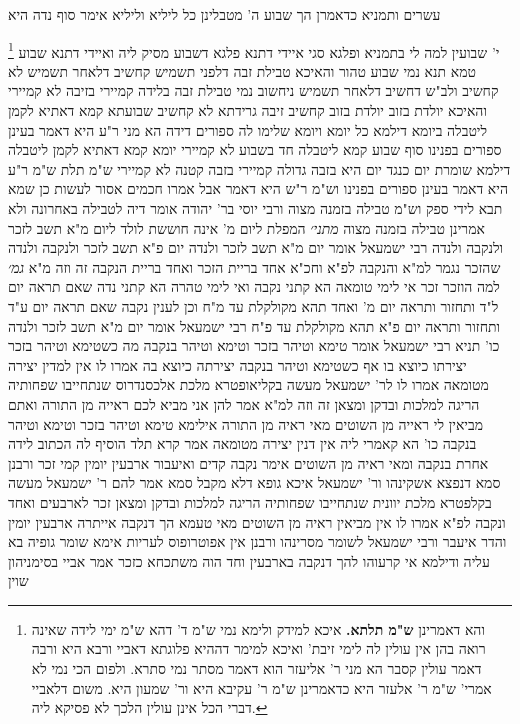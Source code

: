 \documentclass[12pt, openany]{book}
\newcommand{\footnotecomment}[1]{
	\renewcommand\thefootnote{}
	\footnote{#1}}
\newcommand{\commenta}[1]{\footnotecomment{#1}}
\begin{document}
{עשרים ותמניא כדאמרן הך שבוע ה' מטבלינן כל ליליא וליליא אימר סוף נדה היא 
\commenta{והא דאמרינן \textbf{ש"מ תלתא.} איכא למידק ולימא נמי ש"מ ד' דהא ש"מ ימי לידה שאינה רואה בהן אין עולין לה לימי זיבת' ואיכא למימר דההיא פלוגתא דאביי ורבא היא ורבה דאמר עולין קסבר הא מני ר' אליעזר הוא דאמר מסתר נמי סתרא. ולפום הכי נמי לא אמרי' ש"מ ר' אלעזר היא כדאמרינן ש"מ ר' עקיבא היא ור' שמעון היא. משום דלאביי דברי הכל אינן עולין הלכך לא פסיקא ליה. }
י' שבועין למה לי בתמניא ופלגא סגי 
איידי דתנא פלגא דשבוע מסיק ליה ואיידי דתנא שבוע טמא תנא נמי שבוע טהור 
והאיכא טבילת זבה 
דלפני תשמיש קחשיב דלאחר תשמיש לא קחשיב 
ולב"ש דחשיב דלאחר תשמיש ניחשוב נמי טבילת זבה בלידה קמיירי בזיבה לא קמיירי 
והאיכא יולדת בזוב יולדת בזוב קחשיב זיבה גרידתא לא קחשיב 
שבועתא קמא דאתיא לקמן ליטבלה ביומא דילמא כל יומא ויומא שלימו לה ספורים דידה 
הא מני ר"ע היא דאמר בעינן ספורים בפנינו 
סוף שבוע קמא ליטבלה חד בשבוע לא קמיירי 
יומא קמא דאתיא לקמן ליטבלה דילמא שומרת יום כנגד יום היא בזבה גדולה קמיירי בזבה קטנה לא קמיירי 
ש"מ תלת ש"מ ר"ע היא דאמר בעינן ספורים בפנינו 
וש"מ ר"ש היא דאמר אבל אמרו חכמים אסור לעשות כן שמא תבא לידי ספק 
וש"מ טבילה בזמנה מצוה ורבי יוסי בר' יהודה אומר דיה לטבילה באחרונה ולא אמרינן טבילה בזמנה מצוה
{\large\emph{מתני׳}} המפלת ליום מ' אינה חוששת לולד ליום מ"א תשב לזכר ולנקבה ולנדה
רבי ישמעאל אומר יום מ"א תשב לזכר ולנדה יום פ"א תשב לזכר ולנקבה ולנדה שהזכר נגמר למ"א והנקבה לפ"א וחכ"א אחד בריית הזכר ואחד בריית הנקבה זה וזה מ"א
{\large\emph{גמ׳}} למה הוזכר זכר
אי לימי טומאה הא קתני נקבה ואי לימי טהרה
הא קתני נדה 
שאם תראה יום ל"ד ותחזור ותראה יום מ' ואחד תהא מקולקלת עד מ"ח 
וכן לענין נקבה שאם תראה יום ע"ד ותחזור ותראה יום פ"א תהא מקולקלת עד פ"ח
רבי ישמעאל אומר יום מ"א תשב לזכר ולנדה כו' תניא רבי ישמעאל אומר טימא וטיהר בזכר וטימא וטיהר בנקבה
מה כשטימא וטיהר בזכר יצירתו כיוצא בו אף כשטימא וטיהר בנקבה יצירתה כיוצא בה אמרו לו אין למדין יצירה מטומאה 
אמרו לו לר' ישמעאל מעשה בקליאופטרא מלכת אלכסנדרוס שנתחייבו שפחותיה הריגה למלכות ובדקן ומצאן זה וזה למ"א אמר להן אני מביא לכם ראייה מן התורה ואתם מביאין לי ראייה מן השוטים 
מאי ראיה מן התורה אילימא טימא וטיהר בזכר וטימא וטיהר בנקבה כו' הא קאמרי ליה אין דנין יצירה מטומאה 
אמר קרא תלד הוסיף לה הכתוב לידה אחרת בנקבה 
ומאי ראיה מן השוטים אימר נקבה קדים ואיעבור ארבעין יומין קמי זכר 
ורבנן סמא דנפצא אשקינהו ור' ישמעאל איכא גופא דלא מקבל סמא
אמר להם ר' ישמעאל מעשה בקלפטרא מלכת יוונית שנתחייבו שפחותיה הריגה למלכות ובדקן ומצאן זכר לארבעים ואחד ונקבה לפ"א אמרו לו אין מביאין ראיה מן השוטים 
מאי טעמא הך דנקבה אייתרה ארבעין יומין והדר איעבר 
ורבי ישמעאל לשומר מסרינהו ורבנן אין אפוטרופוס לעריות אימא שומר גופיה בא עליה 
ודילמא אי קרעוהו להך דנקבה בארבעין וחד הוה משתכחא כזכר אמר אביי בסימניהון שוין
}
\end{document}
